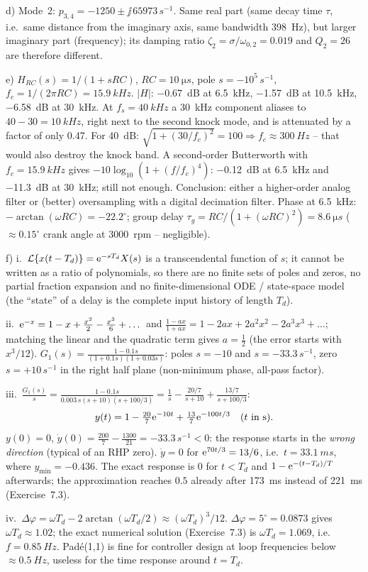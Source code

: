 \begin{solution}
d) Mode~2: $p_{3,4}=-1250\pm\jj\,65973\,\si{s^{-1}}$. Same real part (same decay
time $\tau$, i.e.\ same distance from the imaginary axis, same bandwidth
\SI{398}{Hz}), but larger imaginary part (frequency); its damping ratio
$\zeta_2=\sigma/\omega_{0,2}=0.019$ and $Q_2=26$ are therefore different.

e) $H_{RC}(s)=1/(1+sRC)$, $RC=\SI{10}{\micro s}$, pole $s=-10^5\,\si{s^{-1}}$,
$f_c=1/(2\pi RC)=\SI{15.9}{kHz}$.
$|H|$: \SI{-0.67}{dB} at \SI{6.5}{kHz}, \SI{-1.57}{dB} at \SI{10.5}{kHz},
\SI{-6.58}{dB} at \SI{30}{kHz}. At $f_s=\SI{40}{kHz}$ a \SI{30}{kHz} component
aliases to $40-30=\SI{10}{kHz}$, right next to the second knock mode, and is
attenuated by a factor of only 0.47. For \SI{40}{dB}:
$\sqrt{1+(30/f_c)^2}=100\Rightarrow f_c\approx\SI{300}{Hz}$ -- that would also
destroy the knock band. A second-order Butterworth with $f_c=\SI{15.9}{kHz}$
gives $-10\log_{10}(1+(f/f_c)^4)$: \SI{-0.12}{dB} at \SI{6.5}{kHz} and
\SI{-11.3}{dB} at \SI{30}{kHz}; still not enough. Conclusion: either a
higher-order analog filter or (better) oversampling with a digital decimation
filter. Phase at \SI{6.5}{kHz}: $-\arctan(\omega RC)=-22.2^\circ$; group delay
$\tau_g=RC/(1+(\omega RC)^2)=\SI{8.6}{\micro s}$ ($\approx0.15^\circ$ crank
angle at \SI{3000}{rpm} -- negligible).

f) i.~$\mathcal{L}\{x(t-T_d)\}=\mathrm{e}^{-sT_d}X(s)$ is a transcendental function of $s$;
it cannot be written as a ratio of polynomials, so there are no finite sets of
poles and zeros, no partial fraction expansion and no finite-dimensional ODE /
state-space model (the ``state'' of a delay is the complete input history of
length $T_d$).

ii.~$\mathrm{e}^{-x}=1-x+\frac{x^2}{2}-\frac{x^3}{6}+\dots$ and
$\frac{1-ax}{1+ax}=1-2ax+2a^2x^2-2a^3x^3+\dots$; matching the linear and the
quadratic term gives $a=\frac12$ (the error starts with $x^3/12$). $G_1(s)=
\frac{1-0.1s}{(1+0.1s)(1+0.03s)}$: poles $s=-10$ and $s=-33.3\,\si{s^{-1}}$,
zero $s=+10\,\si{s^{-1}}$ in the right half plane (non-minimum phase, all-pass
factor).

iii.~$\frac{G_1(s)}{s}=\frac{1-0.1s}{0.003\,s(s+10)(s+100/3)}=\frac1s-\frac{20/7}{s+10}+\frac{13/7}{s+100/3}$:
\[ y(t)=1-\tfrac{20}{7}\mathrm{e}^{-10t}+\tfrac{13}{7}\mathrm{e}^{-100t/3}\quad(t\text{ in s}). \]
$y(0)=0$, $\dot y(0)=\frac{200}{7}-\frac{1300}{21}=-33.3\,\si{s^{-1}}<0$: the
response starts in the \emph{wrong direction} (typical of an RHP zero).
$\dot y=0$ for $\mathrm{e}^{70t/3}=13/6$, i.e.\ $t=\SI{33.1}{ms}$, where
$y_{\min}=-0.436$. The exact response is $0$ for $t<T_d$ and
$1-\mathrm{e}^{-(t-T_d)/T}$ afterwards; the approximation reaches $0.5$ already after
\SI{173}{ms} instead of \SI{221}{ms} (Exercise~7.3).

iv.~$\Delta\varphi=\omega T_d-2\arctan(\omega T_d/2)\approx(\omega T_d)^3/12$.
$\Delta\varphi=5^\circ=0.0873$ gives $\omega T_d\approx1.02$; the exact
numerical solution (Exercise~7.3) is $\omega T_d=1.069$, i.e.\
$f=\SI{0.85}{Hz}$. Pad\'e(1,1) is fine for controller design at loop
frequencies below $\approx\SI{0.5}{Hz}$, useless for the time response
around $t=T_d$.
\end{solution}

